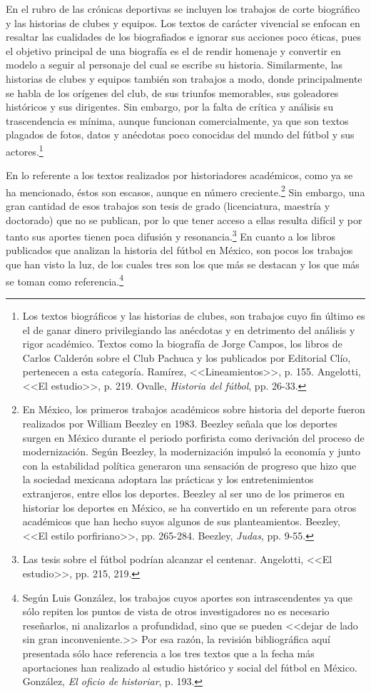 \documentclass[11pt,a5paper,twoside]{book} %
\begin{document}
En el rubro de las crónicas deportivas se incluyen los trabajos de corte biográfico y
las historias de clubes y equipos. Los textos de carácter vivencial se enfocan en resaltar las
cualidades de los biografiados e ignorar sus acciones poco éticas, pues el objetivo principal
de una biografía es el de rendir homenaje y convertir en modelo a seguir al personaje del cual
se escribe su historia. Similarmente, las historias de clubes y equipos también son trabajos a
modo, donde principalmente se habla de los orígenes del club, de sus triunfos memorables,
sus goleadores históricos y sus dirigentes. Sin embargo, por la falta de crítica y análisis su
trascendencia es mínima, aunque funcionan comercialmente, ya que son textos plagados de
fotos, datos y anécdotas poco conocidas del mundo del fútbol y sus actores.\footnote{Los textos biográficos y las historias de clubes, son trabajos cuyo fin último es el de ganar dinero privilegiando las anécdotas y en detrimento del análisis y rigor académico. Textos como la biografía de Jorge Campos, los libros de Carlos Calderón sobre el Club Pachuca y los publicados por Editorial Clío, pertenecen a esta categoría. Ramírez, <<Lineamientos>>, p. 155. Angelotti, <<El estudio>>, p. 219. Ovalle, \emph{Historia del fútbol}, pp. 26-33.}

En lo referente a los textos realizados por historiadores académicos, como ya se ha
mencionado, éstos son escasos, aunque en número creciente.\footnote{En México, los primeros trabajos académicos sobre historia del deporte fueron realizados por William Beezley en 1983. Beezley señala que los deportes surgen en México durante el periodo porfirista como derivación del proceso de modernización. Según Beezley, la modernización impulsó la economía y junto con la estabilidad política generaron una sensación de progreso que hizo que la sociedad mexicana adoptara las prácticas y los entretenimientos extranjeros, entre ellos los deportes. Beezley al ser uno de los primeros en historiar los deportes en México, se ha convertido en un referente para otros académicos que han hecho suyos algunos de sus planteamientos. Beezley, <<El estilo porfiriano>>, pp. 265-284. Beezley, \emph{Judas}, pp. 9-55.} Sin embargo, una gran
cantidad de esos trabajos son tesis de grado (licenciatura, maestría y doctorado) que no se
publican, por lo que tener acceso a ellas resulta difícil y por tanto sus aportes tienen poca
difusión y resonancia.\footnote{Las tesis sobre el fútbol podrían alcanzar el centenar. Angelotti, <<El estudio>>, pp. 215, 219.} En cuanto a los libros publicados que analizan la historia del fútbol en México, son pocos los trabajos que han visto la luz, de los cuales tres son los que más se
destacan y los que más se toman como referencia.\footnote{Según Luis González, los trabajos cuyos aportes son intrascendentes ya que sólo repiten los puntos de vista de otros investigadores no es necesario reseñarlos, ni analizarlos a profundidad, sino que se pueden <<dejar de lado sin gran inconveniente.>> Por esa razón, la revisión bibliográfica aquí presentada sólo hace referencia a los tres textos que a la fecha más aportaciones han realizado al estudio histórico y social del fútbol en México. González, \emph{El oficio de historiar}, p. 193.}
\end{document}
